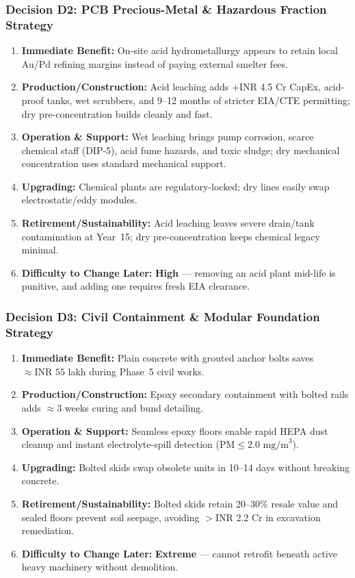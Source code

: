 \subsubsection*{Decision D2: PCB Precious-Metal \& Hazardous Fraction Strategy}
\begin{enumerate}
    \item \textbf{Immediate Benefit:} On-site acid hydrometallurgy appears to retain local Au/Pd refining margins instead of paying external smelter fees.
    \item \textbf{Production/Construction:} Acid leaching adds +INR 4.5 Cr CapEx, acid-proof tanks, wet scrubbers, and 9--12 months of stricter EIA/CTE permitting; dry pre-concentration builds cleanly and fast.
    \item \textbf{Operation \& Support:} Wet leaching brings pump corrosion, scarce chemical staff (DIP-5), acid fume hazards, and toxic sludge; dry mechanical concentration uses standard mechanical support.
    \item \textbf{Upgrading:} Chemical plants are regulatory-locked; dry lines easily swap electrostatic/eddy modules.
    \item \textbf{Retirement/Sustainability:} Acid leaching leaves severe drain/tank contamination at Year~15; dry pre-concentration keeps chemical legacy minimal.
    \item \textbf{Difficulty to Change Later:} \textbf{High} --- removing an acid plant mid-life is punitive, and adding one requires fresh EIA clearance.
\end{enumerate}

\subsubsection*{Decision D3: Civil Containment \& Modular Foundation Strategy}
\begin{enumerate}
    \item \textbf{Immediate Benefit:} Plain concrete with grouted anchor bolts saves $\approx\text{INR } 55$ lakh during Phase~5 civil works.
    \item \textbf{Production/Construction:} Epoxy secondary containment with bolted rails adds $\approx 3$ weeks curing and bund detailing.
    \item \textbf{Operation \& Support:} Seamless epoxy floors enable rapid HEPA dust cleanup and instant electrolyte-spill detection ($\text{PM} \le 2.0\text{ mg/m}^3$).
    \item \textbf{Upgrading:} Bolted skids swap obsolete units in 10--14 days without breaking concrete.
    \item \textbf{Retirement/Sustainability:} Bolted skids retain 20--30\% resale value and sealed floors prevent soil seepage, avoiding $>$INR 2.2 Cr in excavation remediation.
    \item \textbf{Difficulty to Change Later:} \textbf{Extreme} --- cannot retrofit beneath active heavy machinery without demolition.
\end{enumerate}
